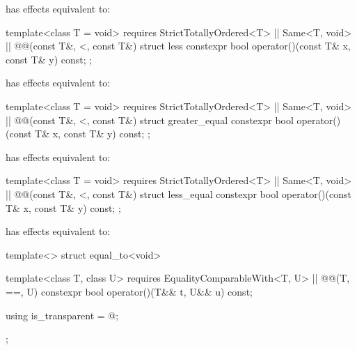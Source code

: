 {\begin{itemdescr}
\pnum
{} has effects equivalent to: 
\end{itemdescr}

%
\begin{itemdecl}
template<class T = void>
  requires StrictTotallyOrdered<T> || Same<T, void> || @\textit{}@(const T&, <, const T&)
struct less {
  constexpr bool operator()(const T& x, const T& y) const;
};
\end{itemdecl}

\begin{itemdescr}
\pnum
{} has effects equivalent to: 
\end{itemdescr}

%
\begin{itemdecl}
template<class T = void>
  requires StrictTotallyOrdered<T> || Same<T, void> || @\textit{}@(const T&, <, const T&)
struct greater_equal {
  constexpr bool operator()(const T& x, const T& y) const;
};
\end{itemdecl}

\begin{itemdescr}
\pnum
{} has effects equivalent to: 
\end{itemdescr}

%
\begin{itemdecl}
template<class T = void>
  requires StrictTotallyOrdered<T> || Same<T, void> || @\textit{}@(const T&, <, const T&)
struct less_equal {
  constexpr bool operator()(const T& x, const T& y) const;
};
\end{itemdecl}

\begin{itemdescr}
\pnum
{} has effects equivalent to: 
\end{itemdescr}

%
\begin{itemdecl}
template<> struct equal_to<void> {
  template<class T, class U>
    requires EqualityComparableWith<T, U> || @\textit{}@(T, ==, U)
  constexpr bool operator()(T&& t, U&& u) const;

  using is_transparent = @\unspecnc@;
};
\end{itemdecl}

}
